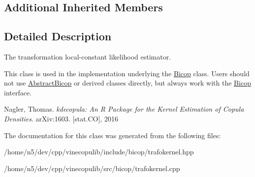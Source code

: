 \subsection*{Additional Inherited Members}


\subsection{Detailed Description}
The transformation local-\/constant likelihood estimator. 

This class is used in the implementation underlying the \hyperlink{classvinecopulib_1_1_bicop}{Bicop} class. Users should not use \hyperlink{classvinecopulib_1_1_abstract_bicop}{Abstract\+Bicop} or derived classes directly, but always work with the \hyperlink{classvinecopulib_1_1_bicop}{Bicop} interface.

Nagler, Thomas. {\itshape kdecopula\+: An R Package for the Kernel Estimation of Copula Densities}. ar\+Xiv\+:1603. \mbox{[}stat.\+CO\mbox{]}, 2016 

The documentation for this class was generated from the following files\+:\begin{DoxyCompactItemize}
\item 
/home/n5/dev/cpp/vinecopulib/include/bicop/trafokernel.\+hpp\item 
/home/n5/dev/cpp/vinecopulib/src/bicop/trafokernel.\+cpp\end{DoxyCompactItemize}
